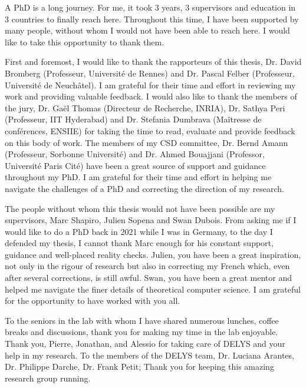 %

A PhD is a long journey. For me, it took 3 years, 3 supervisors and education in 3 countries to finally reach here. Throughout this time, I have been supported by many people, without whom I would not have been able to reach here. I would like to take this opportunity to thank them. 

First and foremost, I would like to thank the rapporteurs of this thesis, Dr. David Bromberg (Professeur, Université de Rennes) and Dr. Pascal Felber (Professeur, Université de Neuchâtel). I am grateful for their time and effort in reviewing my work and providing valuable feedback. I would also like to thank the members of the jury, Dr. Gaël Thomas (Directeur de Recherche, INRIA), Dr. Sathya Peri (Professeur, IIT Hyderabad) and Dr. Stefania Dumbrava (Maîtresse de conférences, ENSIIE) for taking the time to read, evaluate and provide feedback on this body of work. The members of my CSD committee, Dr. Bernd Amann (Professeur, Sorbonne Université) and Dr. Ahmed Bouajjani (Professor, Université Paris Cité) have been a great source of support and guidance throughout my PhD. I am grateful for their time and effort in helping me navigate the challenges of a PhD and correcting the direction of my research. 

The people without whom this thesis would not have been possible are my supervisors, Marc Shapiro, Julien Sopena and Swan Dubois. From asking me if I would like to do a PhD back in 2021 while I was in Germany, to the day I defended my thesis, I cannot thank Marc enough for his constant support, guidance and well-placed reality checks. Julien, you have been a great inspiration, not only in the rigour of research but also in correcting my French which, even after several corrections, is still awful. Swan, you have been a great mentor and helped me navigate the finer details of theoretical computer science. I am grateful for the opportunity to have worked with you all.

To the seniors in the lab with whom I have shared numerous lunches, coffee breaks and discussions, thank you for making my time in the lab enjoyable. Thank you, Pierre, Jonathan, and Alessio for taking care of DELYS and your help in my research. To the members of the DELYS team, Dr. Luciana Arantes, Dr. Philippe Darche, Dr. Frank Petit; Thank you for keeping this amazing research group running.

